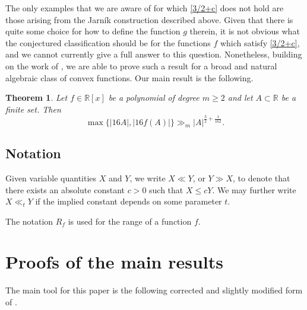 \documentclass[11pt]{amsart}
\newtheorem{theorem}{Theorem}[section]
\begin{document}
The only examples that we are aware of for which \eqref{3/2+c} does not hold are those arising from the Jarn\'{i}k construction described above. Given that there is quite some choice for how to define the function $g$ therein, it is not obvious what the conjectured classification should be for the functions $f$ which satisfy \eqref{3/2+c}, and we cannot currently give a full answer to this question. Nonetheless, building on the work of \cite{Ro}, we are able to prove such a result for a broad and natural algebraic class of convex functions. Our main result is the following.
\begin{theorem} \label{thm:mainpoly}
    Let $f \in \mathbb R[x]$ be a polynomial of degree $m \geq 2$ and let $A \subset \mathbb R$ be a finite set. Then
    \[
    \max \{ |16A|, |16f(A)| \} \gg_m |A|^{\frac{3}{2}+ \frac{1}{162}}.
    \]
\end{theorem}

\subsection*{Notation}
Given variable quantities $X$ and $Y$, we write $X\ll Y$, or $Y\gg X$, to denote that there exists an absolute constant $c>0$ such that $X\le cY$. We may further write $X\ll_t Y$ if the implied constant depends on some parameter $t$.

The notation $R_f$ is used for the range of a function $f.$ 

\section{Proofs of the main results}
The main tool for this paper is the following corrected and slightly modified form of \cite[Theorem 3.1]{Ro}.
\end{document}
